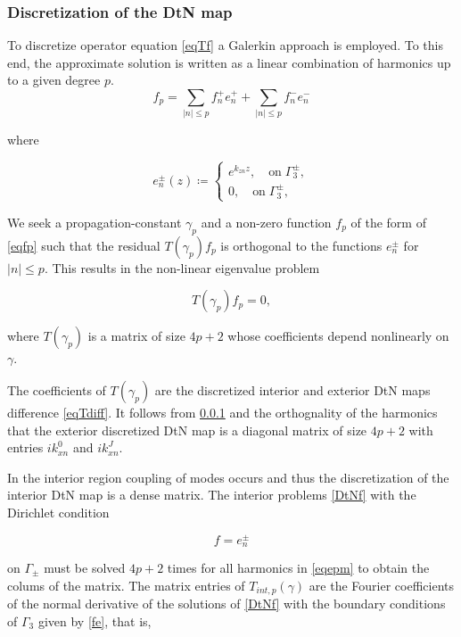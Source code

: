 \subsubsection{Discretization of the DtN map}
To discretize operator equation \ref{eqTf} a Galerkin approach is
employed. To this end, the approximate solution is written as a linear
combination of harmonics up to a given degree $p$.
\begin{equation}
f_p = \sum_{|n|\leq p} f_n^+ e_n^+ + \sum_{|n| \leq p} f_n^- e_n^-
\label{eqfp}
\end{equation} 

where

\begin{equation}
e_n^\pm (z)\coloneqq \left \{ \begin{array} {ll}
e^{k_{zn} z}, \quad \textrm{on} \; \Gamma_3^{\pm}, \\
0, \quad \textrm{on} \; \Gamma_3^\pm,
\end{array} \right .
\label{eqepm}
\end{equation} 

We seek a propagation-constant $\gamma_p$ and a non-zero function $f_p$ of
the form of \ref{eqfp} such that the residual $T(\gamma_p) f_p$ is
orthogonal to the functions $e_n^\pm$ for $|n| \leq p$. This
results in the non-linear eigenvalue problem

\begin{equation}
T(\gamma_p) f_p = 0,
\label{eqTpfp}
\end{equation} 

where $T(\gamma_p)$ is a matrix of size $4p+2$ whose coefficients depend nonlinearly on $\gamma$.

The coefficients of $T(\gamma_p)$ are the discretized interior and
exterior DtN maps difference \ref{eqTdiff}. It follows from \ref{} and
the orthognality of the harmonics that the exterior discretized DtN
map is a diagonal matrix of size $4p+2$ with entries $ik_{xn}^0$ and
$ik_{xn}^J$.

In the interior region coupling of modes occurs and thus the
discretization of the interior DtN map is a dense matrix. The interior
problems \ref{DtNf} with the Dirichlet condition

\begin{equation}
  f = e_n^\pm
\label{fe}
\end{equation} 

on $\Gamma_\pm$ must be solved $4p+2$ times for all harmonics in
\ref{eqepm} to obtain the colums of the matrix. The matrix entries of
$T_{int,p}(\gamma)$ are the Fourier coefficients of the normal
derivative of the solutions of \ref{DtNf} with the boundary conditions of
$\Gamma_3$ given by \ref{fe}, that is,

